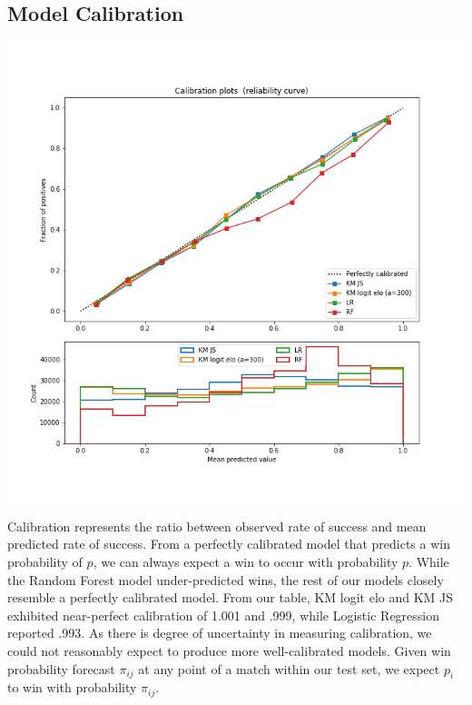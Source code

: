 \documentclass[chapterprefix=false]{report}
\begin{document}

\subsection{Model Calibration}

\hspace*{-.5cm}\includegraphics[scale=.6]{calibration_plot}

Calibration represents the ratio between observed rate of success and mean predicted rate of success. From a perfectly calibrated model that predicts a win probability of $p$, we can always expect a win to occur with probability $p$. While the Random Forest model under-predicted wins, the rest of our models closely resemble a perfectly calibrated model. From our table, KM logit elo and KM JS exhibited near-perfect calibration of 1.001 and .999, while Logistic Regression reported .993. As there is degree of uncertainty in measuring calibration, we could not reasonably expect to produce more well-calibrated models. Given win probability forecast $\pi_{ij}$ at any point of a match within our test set, we expect $p_i$ to win with probability $\pi_{ij}$.
\end{document}
